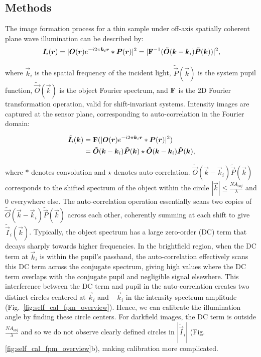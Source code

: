\subsection{Methods}
The image formation process for a thin sample under off-axis spatially coherent plane wave illumination can be described by:
\begin{equation}
\bm{I}_i(\bm{r}) = |\bm{O}(\bm{r})e^{-i2\pi \bm{k}_i\bm{r}} * \bm{P}(\bm{r})|^2 = |\mathbf{F}^{-1}(\tilde{\bm{O}}(\bm{k}-\bm{k}_i)\tilde{\bm{P}}(\bm{k}))|^2,
\label{eq:forwardModel}
\end{equation}

\noindent where $\vec{k}_i$ is the spatial frequency of the incident light, $\tilde{\vec{P}}(\vec{k})$ is the system pupil function, $\tilde{\vec{O}}(\vec{k})$ is the object Fourier spectrum, and $\mathbf{F}$ is the 2D Fourier transformation operation, valid for shift-invariant systems. Intensity images are captured at the sensor plane, corresponding to auto-correlation in the Fourier domain:

\begin{equation}
\begin{split}
\tilde{\bm{I}}_i(\bm{k}) &= \mathbf{F}(|\bm{O}(\bm{r})e^{-i2\pi \bm{k}_i\bm{r}} * \bm{P}(\bm{r})|^2) \\
&=\tilde{\bm{O}}(\bm{k}-\bm{k}_i)\tilde{\bm{P}}(\bm{k}) \star \tilde{\bm{O}}(\bm{k}-\bm{k}_i)\tilde{\bm{P}}(\bm{k}),
\end{split}
\label{eq:Fourier domain}
\end{equation}

\noindent where $*$ denotes convolution and $\star$ denotes auto-correlation. $\tilde{\vec{O}}(\vec{k}-\vec{k}_i)\tilde{\vec{P}}(\vec{k})$ corresponds to the shifted spectrum of the object within the circle $|\vec{k}| \leq \frac{NA_{obj}}{\lambda}$ and 0 everywhere else. The auto-correlation operation essentially scans two copies of $\tilde{\vec{O}}(\vec{k}-\vec{k}_i)\tilde{\vec{P}}(\vec{k})$ across each other, coherently summing at each shift to give $\tilde{\vec{I}}_i(\vec{k})$. Typically, the object spectrum has a large zero-order (DC) term that decays sharply towards higher frequencies. In the brightfield region, when the DC term at $\vec{k}_i$ is within the pupil's passband, the auto-correlation effectively scans this DC term across the conjugate spectrum, giving high values where the DC term overlaps with the conjugate pupil and negligible signal elsewhere. This interference between the DC term and pupil in the auto-correlation creates two distinct circles centered at $\vec{k}_i$ and $-\vec{k}_i$ in the intensity spectrum amplitude (Fig.~\ref{fig:self_cal_fpm_overview}). Hence, we can calibrate the illumination angle by finding these circle centers. For darkfield images, the DC term is outside $\frac{NA_{obj}}{\lambda}$ and so we do not observe clearly defined circles in $|\tilde{\vec{I}}_i|$ (Fig.\ref{fig:self_cal_fpm_overview}b), making calibration more complicated.

